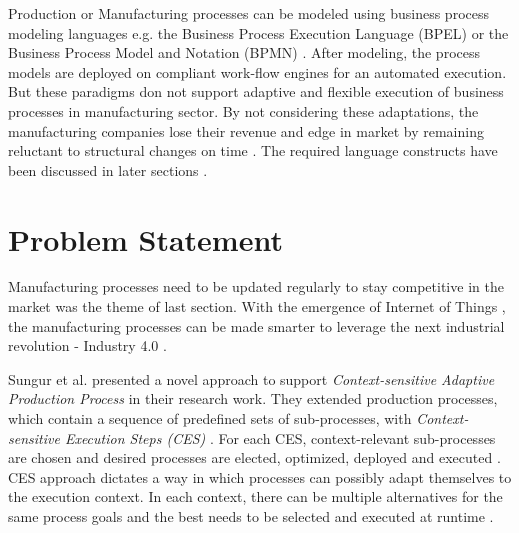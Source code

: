 Production or Manufacturing processes can be modeled using business process modeling languages e.g. the Business Process Execution Language (\acs{BPEL}) \cite{BPELSPEC} or the Business Process Model and Notation (\acs{BPMN}) \cite{OMGSPEC}. After modeling, the process models are deployed on compliant work-flow engines for an automated execution. But these paradigms don not support adaptive and flexible execution of business processes in manufacturing sector. By not considering these adaptations, the manufacturing companies lose their revenue and edge in market by remaining reluctant to structural changes on time \cite{TIMURCIRP,CONWORKFLOW}. The required language constructs have been discussed in later sections .

\section{Problem Statement}
Manufacturing processes need to be updated regularly to stay competitive in the market was the theme of last section. With the emergence of Internet of Things , the manufacturing processes can be made smarter to leverage the next industrial revolution - Industry 4.0 .

Sungur et al. \cite{TIMURCIRP} presented a novel approach to support \textit{Context-sensitive Adaptive Production Process} in their research work. They extended production processes, which contain a sequence of predefined sets of sub-processes, with \textit{Context-sensitive Execution Steps (\acs{CES})} . For each \acs{CES}, context-relevant sub-processes are chosen and desired processes are elected, optimized, deployed and executed \cite{TIMURCIRP}. \acs{CES} approach dictates a way in which processes can possibly adapt themselves to the execution context. In each context, there can be multiple alternatives for the same process goals and the best needs to be selected and executed at runtime \cite{TIMURCIRP}.

